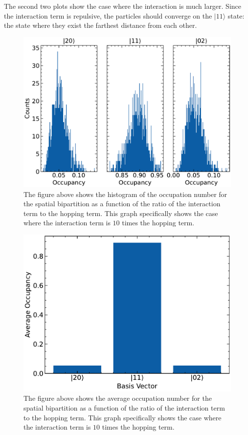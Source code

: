 The second two plots show the case where the interaction is much larger. Since the interaction term is repulsive, the particles should converge on the $|11\rangle$ state: the state where they exist the farthest distance from each other.

\begin{figure}[H]
\centering
\includegraphics[scale=0.5]{../figures/sep_occ_hist_U_10.0000.pdf}
\caption{The figure above shows the histogram of the occupation number for the spatial bipartition as a function of the ratio of the interaction term to the hopping term. This graph specifically shows the case where the interaction term is $10$ times the hopping term.}
\label{fig:sep_occ_hist_U_10.0000}
\end{figure}

\begin{figure}[H]
\centering
\includegraphics[scale=0.5]{../figures/spatial_avg_occ_U_10.0000.pdf}
\caption{The figure above shows the average occupation number for the spatial bipartition as a function of the ratio of the interaction term to the hopping term. This graph specifically shows the case where the interaction term is $10$ times the hopping term.}
\label{fig:spatial_avg_occ_U_10.0000}    
\end{figure}

